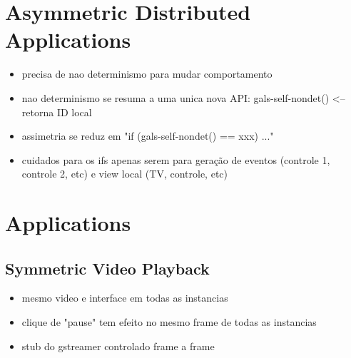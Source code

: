 \documentclass[sigplan,screen]{acmart}
\begin{document}
\section{Asymmetric Distributed Applications}

\begin{itemize}
\item precisa de nao determinismo para mudar comportamento
\item nao determinismo se resuma a uma unica nova API: gals-self-nondet()  <-- retorna ID local
\item assimetria se reduz em "if (gals-self-nondet() == xxx) ..."
\item cuidados para os ifs apenas serem para geração de eventos (controle 1, controle 2, etc) e view local (TV, controle, etc)
\end{itemize}

\section{Applications}
\label{sec.apps}

\subsection{Symmetric Video Playback}

\begin{itemize}
\item mesmo video e interface em todas as instancias
\item clique de "pause" tem efeito no mesmo frame de todas as instancias
\item stub do gstreamer controlado frame a frame
\end{itemize}
\end{document}

